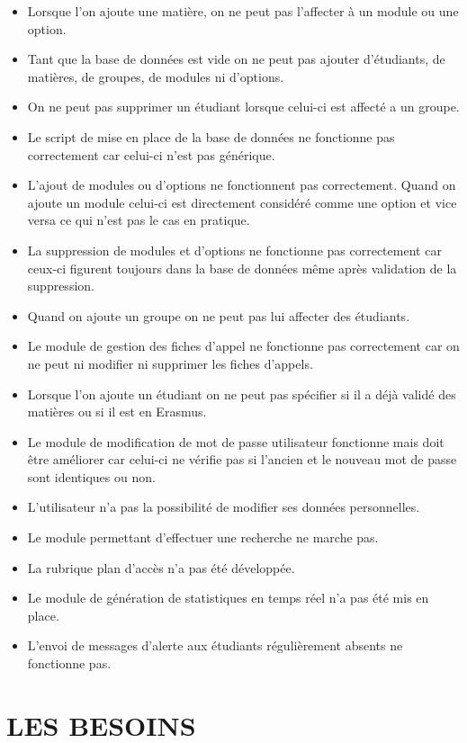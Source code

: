 \documentclass[overfullbox]{polytech/polytech}
\begin{document}
\begin{itemize}
\item Lorsque l'on ajoute une matière, on ne peut pas l'affecter à un module ou une option.
\item Tant que la base de données est vide on ne peut pas ajouter d'étudiants, de matières, de groupes, de modules ni d'options.
\item On ne peut pas supprimer un étudiant lorsque celui-ci est affecté a un groupe.
  \item Le script de mise en place de la base de données ne fonctionne pas correctement car celui-ci n'est pas générique.
  \item L'ajout de modules ou d'options ne fonctionnent pas correctement. Quand on ajoute un module celui-ci est directement considéré comme une option et vice versa ce qui n'est pas le cas en pratique.
  \item La suppression de modules et d'options ne fonctionne pas correctement car ceux-ci figurent toujours dans la base de données même après validation de la suppression. 
  \item Quand on ajoute un groupe on ne peut pas lui affecter des étudiants.
  \item Le module de gestion des fiches d'appel ne fonctionne pas correctement car \textbf{}on ne peut ni modifier ni supprimer les fiches d'appels.
  \item Lorsque l'on ajoute un étudiant on ne peut pas spécifier si il a déjà validé des matières ou si il est en Erasmus.
 \item Le module de modification de mot de passe utilisateur fonctionne mais doit être améliorer car celui-ci ne vérifie pas si l'ancien et le nouveau mot de passe sont identiques ou non.
 \item L'utilisateur n'a pas la possibilité de modifier ses données personnelles.
 \item Le module permettant d'effectuer une recherche ne marche pas.
\item La rubrique plan d'accès n'a pas été développée. 
\item Le module de génération de statistiques en temps réel n'a pas été mis en place.
\item L'envoi de messages d'alerte aux étudiants régulièrement absents ne fonctionne pas.

\end{itemize}

\section{LES BESOINS}
\end{document}
